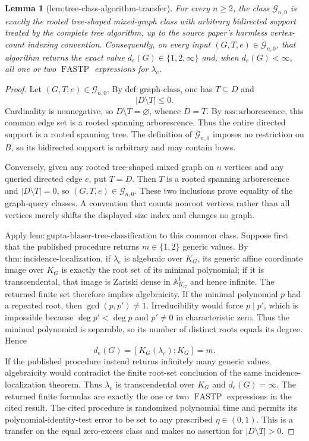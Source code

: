 \documentclass{article}
\newtheorem{lemma}{Lemma}
\begin{document}
\begin{lemma}[lem:tree-class-algorithm-transfer]\label{lem:tree-class-algorithm-transfer}
For every \(n\geq2\), the class \(\mathcal G_{n,0}\) is exactly the rooted tree-shaped mixed-graph class with arbitrary bidirected support treated by the complete tree algorithm, up to the source paper's harmless vertex-count indexing convention. Consequently, on every input \((G,T,e)\in\mathcal G_{n,0}\), that algorithm returns the exact value \(d_e(G)\in\{1,2,\infty\}\) and, when \(d_e(G)<\infty\), all one or two \(\operatorname{FASTP}\) expressions for \(\lambda_e\).
\end{lemma}
\begin{proof}
Let \((G,T,e)\in\mathcal G_{n,0}\). By \(\mathrm{def:graph\mbox{-}class}\), one has \(T\subseteq D\) and
\[
 |D\setminus T|\leq0.
\]
Cardinality is nonnegative, so \(D\setminus T=\varnothing\), whence \(D=T\). By \(\mathrm{ass:arborescence}\), this common edge set is a rooted spanning arborescence. Thus the entire directed support is a rooted spanning tree. The definition of \(\mathcal G_{n,0}\) imposes no restriction on \(B\), so its bidirected support is arbitrary and may contain bows.

Conversely, given any rooted tree-shaped mixed graph on \(n\) vertices and any queried directed edge \(e\), put \(T=D\). Then \(T\) is a rooted spanning arborescence and \(|D\setminus T|=0\), so \((G,T,e)\in\mathcal G_{n,0}\). These two inclusions prove equality of the graph-query classes. A convention that counts nonroot vertices rather than all vertices merely shifts the displayed size index and changes no graph.

Apply \(\mathrm{lem:gupta\mbox{-}blaser\mbox{-}tree\mbox{-}classification}\) to this common class. Suppose first that the published procedure returns \(m\in\{1,2\}\) generic values. By \(\mathrm{thm:incidence\mbox{-}localization}\), if \(\lambda_e\) is algebraic over \(K_G\), its generic affine coordinate image over \(\overline{K_G}\) is exactly the root set of its minimal polynomial; if it is transcendental, that image is Zariski dense in \(\mathbb A^1_{K_G}\) and hence infinite. The returned finite set therefore implies algebraicity. If the minimal polynomial \(p\) had a repeated root, then \(\gcd(p,p')\neq1\). Irreducibility would force \(p\mid p'\), which is impossible because \(\deg p'<\deg p\) and \(p'\neq0\) in characteristic zero. Thus the minimal polynomial is separable, so its number of distinct roots equals its degree. Hence
\[
 d_e(G)=[K_G(\lambda_e):K_G]=m.
\]
If the published procedure instead returns infinitely many generic values, algebraicity would contradict the finite root-set conclusion of the same incidence-localization theorem. Thus \(\lambda_e\) is transcendental over \(K_G\) and \(d_e(G)=\infty\). The returned finite formulas are exactly the one or two \(\operatorname{FASTP}\) expressions in the cited result. The cited procedure is randomized polynomial time and permits its polynomial-identity-test error to be set to any prescribed \(\eta\in(0,1)\). This is a transfer on the equal zero-excess class and makes no assertion for \(|D\setminus T|>0\).
\end{proof}
\end{document}
